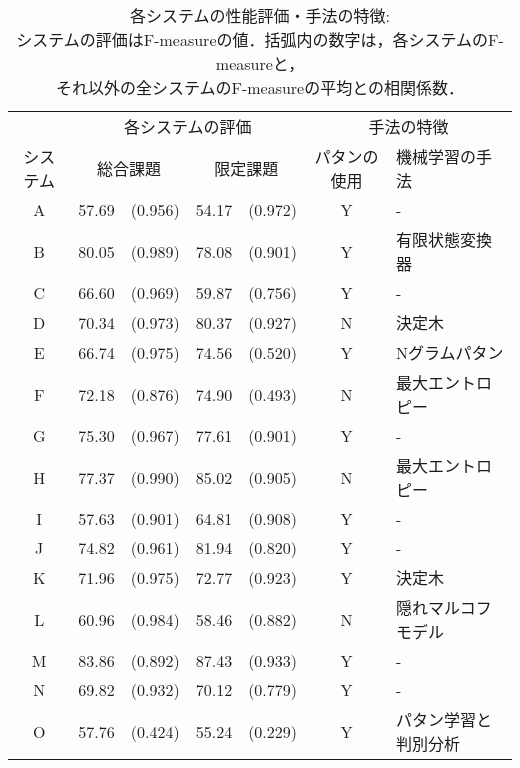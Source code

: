 \begin{table*}
\begin{center}\small
\caption{各システムの性能評価・手法の特徴:\\システムの評価はF-measureの値．括弧内の数字は，各システムのF-measureと，\\それ以外の全システムのF-measureの平均との相関係数．}
\label{table:each_system_fmeasure}
\begin{tabular}{c|rr|rr|cl} \hline
         & \multicolumn{4}{|c|}{各システムの評価} & \multicolumn{2}{c}{手法の特徴}       \\ \cline{2-7} 
システム & \multicolumn{2}{|c|}{総合課題} & \multicolumn{2}{|c|}{限定課題}  & パタンの使用 & 機械学習の手法       \\ \hline
A        & 57.69    & (0.956)         & 54.17    & (0.972)          & Y            & -                    \\       
B        & 80.05    & (0.989)         & 78.08    & (0.901)          & Y            & 有限状態変換器       \\       
C        & 66.60    & (0.969)         & 59.87    & (0.756)          & Y            & -                    \\       
D        & 70.34    & (0.973)         & 80.37    & (0.927)          & N            & 決定木               \\       
E        & 66.74    & (0.975)         & 74.56    & (0.520)          & Y            & Nグラムパタン        \\       
F        & 72.18    & (0.876)         & 74.90    & (0.493)          & N            & 最大エントロピー     \\       
G        & 75.30    & (0.967)         & 77.61    & (0.901)          & Y            & -                    \\       
H        & 77.37    & (0.990)         & 85.02    & (0.905)          & N            & 最大エントロピー     \\       
I        & 57.63    & (0.901)         & 64.81    & (0.908)          & Y            & -                    \\       
J        & 74.82    & (0.961)         & 81.94    & (0.820)          & Y            & -                    \\       
K        & 71.96    & (0.975)         & 72.77    & (0.923)          & Y            & 決定木               \\       
L        & 60.96    & (0.984)         & 58.46    & (0.882)          & N            & 隠れマルコフモデル   \\       
M        & 83.86    & (0.892)         & 87.43    & (0.933)          & Y            & -                    \\       
N        & 69.82    & (0.932)         & 70.12    & (0.779)          & Y            & -                    \\       
O        & 57.76    & (0.424)         & 55.24    & (0.229)          & Y            & パタン学習と判別分析 \\ \hline
\end{tabular}
\end{center}
\end{table*}

